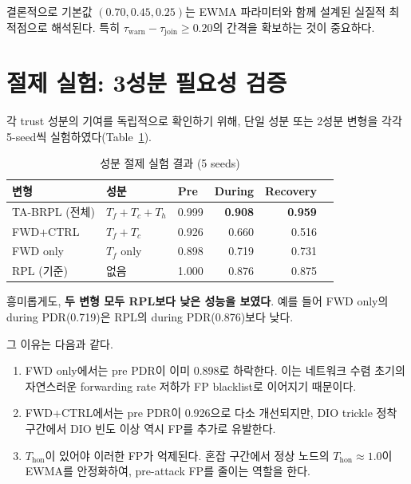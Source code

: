 \documentclass[12pt,a4paper]{article}
\begin{document}
결론적으로 기본값 $(0.70, 0.45, 0.25)$는 EWMA 파라미터와 함께 설계된
실질적 최적점으로 해석된다. 특히 $\tau_\text{warn} - \tau_\text{join} \ge 0.20$의
간격을 확보하는 것이 중요하다.

\section{절제 실험: 3성분 필요성 검증}

각 trust 성분의 기여를 독립적으로 확인하기 위해,
단일 성분 또는 2성분 변형을 각각 5-seed씩 실험하였다(Table~\ref{tab:ablation}).

\begin{table}[t]
  \centering
  \caption{성분 절제 실험 결과 (5 seeds)}
  \label{tab:ablation}
  \begin{tabular}{lllrrr}
    \toprule
    변형 & 성분 & Pre & During & Recovery \\
    \midrule
    TA-BRPL (전체) & $T_f + T_c + T_h$ & 0.999 & \textbf{0.908} & \textbf{0.959} \\
    FWD+CTRL       & $T_f + T_c$        & 0.926 & 0.660 & 0.516 \\
    FWD only       & $T_f$ only         & 0.898 & 0.719 & 0.731 \\
    \midrule
    RPL (기준)     & 없음               & 1.000 & 0.876 & 0.875 \\
    \bottomrule
  \end{tabular}
\end{table}

흥미롭게도, \textbf{두 변형 모두 RPL보다 낮은 성능을 보였다}.
예를 들어 FWD only의 during PDR(0.719)은 RPL의 during PDR(0.876)보다 낮다.

그 이유는 다음과 같다.
\begin{enumerate}
  \item FWD only에서는 pre PDR이 이미 0.898로 하락한다.  
  이는 네트워크 수렴 초기의 자연스러운 forwarding rate 저하가 FP blacklist로 이어지기 때문이다.
  \item FWD+CTRL에서는 pre PDR이 0.926으로 다소 개선되지만,
  DIO trickle 정착 구간에서 DIO 빈도 이상 역시 FP를 추가로 유발한다.
  \item $T_\text{hon}$이 있어야 이러한 FP가 억제된다.  
  혼잡 구간에서 정상 노드의 $T_\text{hon} \approx 1.0$이 EWMA를 안정화하여,
  pre-attack FP를 줄이는 역할을 한다.
\end{enumerate}
\end{document}
